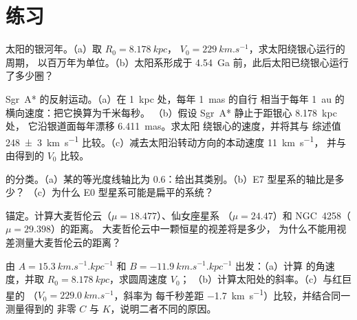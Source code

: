 \section{练习}

\begin{exercise}[$\star$]\label{exo:b3:milky-way-galaxies:1}
太阳的银河年。（a）取 $R_0 = \qty{8.178}{kpc}$，
$V_0 = \qty{229}{km.s^{-1}}$，求太阳绕银心运行的周期，
以百万年为单位。（b）太阳系形成于
\qty{4.54}{Ga} 前，此后太阳已绕银心运行了多少圈？
\end{exercise}

\begin{exercise}[$\star$]\label{exo:b3:milky-way-galaxies:2}
Sgr~A* 的反射运动。（a）在 \qty{1}{kpc} 处，每年 \qty{1}{mas} 的自行
相当于每年 \qty{1}{au} 的横向速度：把它换算为千米每秒。
（b）假设 Sgr~A* 静止于距银心 \qty{8.178}{kpc} 处，
它沿银道面每年漂移 \qty{6.411}{mas}。求太阳
绕银心的速度，并将其与
综述值 \qty[separate-uncertainty=true]{248 \pm 3}{km.s^{-1}} 比较。（c）减去太阳沿转动方向的本动速度
\qty{11}{km.s^{-1}}，
并与由得到的 $V_0$ 比较。
\end{exercise}

\begin{exercise}[$\star$]\label{exo:b3:milky-way-galaxies:3}
的分类。（a）某的等光度线轴比为
0.6：给出其类别。（b）E7 型星系的轴比是多少？
（c）为什么 E0 型星系可能是扁平的系统？
\end{exercise}

\begin{exercise}[$\star$]\label{exo:b3:milky-way-galaxies:4}
锚定。计算大麦哲伦云（$\mu = 18.477$）、仙女座星系
（$\mu = 24.47$）和 NGC~4258（$\mu = 29.398$）的距离。
大麦哲伦云中一颗恒星的视差将是多少，
为什么不能用视差测量大麦哲伦云的距离？
\end{exercise}

\begin{exercise}[$\star\star$]\label{exo:b3:milky-way-galaxies:5}
由 $A = \qty{15.3}{km.s^{-1}.kpc^{-1}}$ 和
$B = \qty{-11.9}{km.s^{-1}.kpc^{-1}}$ 出发：（a）计算
的角速度，并取 $R_0 = \qty{8.178}{kpc}$，求圆周速度 $V_0$；
（b）计算太阳处的斜率。（c）与红巨星的
（$V_0 = \qty{229.0}{km.s^{-1}}$，斜率为
每千秒差距 \qty{-1.7}{km.s^{-1}}）比较，并结合同一测量得到的
非零 $C$ 与 $K$，说明二者不同的原因。
\end{exercise}

